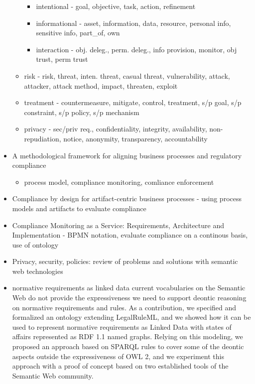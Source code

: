 \begin{itemize}
\begin{itemize}
\begin{itemize}
		\item intentional - goal, objective, task, action, refinement
		\item informational - asset, information, data, resource, personal info, sensitive info, part\_of, own
		\item interaction - obj. deleg., perm. deleg., info provision, monitor, obj trust, perm trust
		\end{itemize}
	\item risk - risk, threat, inten. threat, casual threat, vulnerability, attack, attacker, attack method, impact, threaten, exploit
	\item treatment - countermeasure, mitigate, control, treatment, s/p goal, s/p constraint, s/p policy, s/p mechanism
	\item privacy - sec/priv req., confidentiality, integrity, availability, non-repudiation, notice, anonymity, transparency, accountability
	\end{itemize}
\item A methodological framework for aligning business processes and regulatory compliance
	\begin{itemize}
	\item process model, compliance monitoring, comliance enforcement
	\end{itemize}
\item Compliance by design for artifact-centric business processes - using process models and artifacts to evaluate compliance
\item Compliance Monitoring as a Service: Requirements, Architecture and Implementation - BPMN notation, evaluate compliance on a continous basis, use of ontology
\item Privacy, security, policies: review of problems and solutions with semantic web technologies \cite{kirrane_privacy_2018}
\item normative requirements as linked data \cite{gandon_normative_2017} current vocabularies on the Semantic Web do not provide the expressiveness we need to support deontic reasoning on normative
requirements and rules. As a contribution, we specified and formalized an ontology extending LegalRuleML, and we showed how it can be used to represent normative requirements as Linked Data with states of affairs represented as RDF 1.1 named graphs. Relying on this modeling, we proposed an approach based on SPARQL rules to cover some of the deontic aspects outside the expressiveness of OWL 2, and we experiment this approach with a proof of concept based on two established tools of the Semantic Web community.

\end{itemize}
